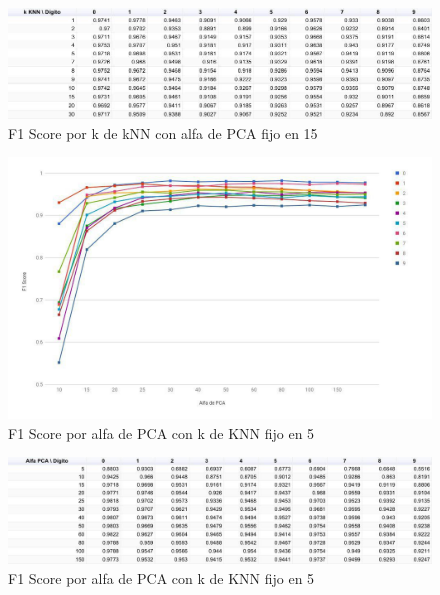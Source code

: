 \begin{figure}[H]
    \begin{center}
      \includegraphics[width=0.8\columnwidth]{imagenes/knn-f1-table.jpg}
      \caption{F1 Score por k de kNN con alfa de PCA fijo en 15}
    \end{center}
\end{figure}

\begin{figure}[H]
    \begin{center}
      \includegraphics[width=0.8\columnwidth]{imagenes/pca-f1.jpg}
      \caption{F1 Score por alfa de PCA con k de KNN fijo en 5}
    \end{center}
\end{figure}

\begin{figure}[H]
    \begin{center}
      \includegraphics[width=0.8\columnwidth]{imagenes/pca-f1-table.jpg}
      \caption{F1 Score por alfa de PCA con k de KNN fijo en 5}
    \end{center}
\end{figure}